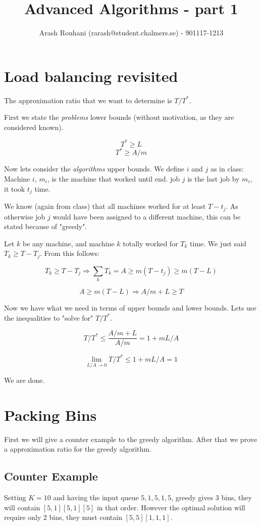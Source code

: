 \documentclass[a4paper,11pt]{article}
\title{Advanced Algorithms - part 1}
\author{Arash Rouhani (rarash@student.chalmers.se) - 901117-1213}
\begin{document}
\maketitle

\section{Load balancing revisited}
The approximation ratio that we want to determine is $T/T^*$.

First we state the \emph{problems} lower bounds (without motivation, as they
are considered known).

$$ T^* \geq L $$
$$ T^* \geq A/m $$

Now lets consider the \emph{algorithms} upper bounds. We define $i$ and $j$
as in class: Machine $i$, $m_i$, is the machine that worked until end.
job $j$ is the last job by $m_i$, it took $t_j$ time. 

We know (again from class) that all machines worked for at least $T - t_j$.
As otherwise job $j$ would have been assigned to a different machine,
this can be stated because of "greedy".

Let $k$ be any machine, and machine $k$ totally worked for $T_k$ time.
We just said $T_k \geq T - T_j$. From this follows:

\[
 T_k \geq T - T_j \Rightarrow \sum_{k} T_k = A \geq m(T-t_j) \geq m(T-L)
\]

\[
 A \geq m(T-L) \Rightarrow A/m + L \geq T
\]

Now we have what we need in terms of upper bounds and lower bounds.
Lets use the inequalities to "solve for" $T/T^*$.

\[
 T/T^* \leq \frac{A/m + L}{A/m} = 1 + mL/A
\]

\[
  \lim_{L/A \to 0} T/T^* \leq 1 + mL/A = 1
\]

We are done.

\section{Packing Bins}

First we will give a counter example to the greedy algorithm.
After that we prove a approximation ratio for the greedy algorithm.

\subsection{Counter Example}

Setting $K = 10$ and having the input queue $5, 1, 5, 1, 5$, greedy gives
3 bins, they will contain $[5, 1] [5,1] [5]$ in that order. However the optimal
solution will require only 2 bins, they must contain $[5, 5] [1, 1, 1]$.
\end{document}
